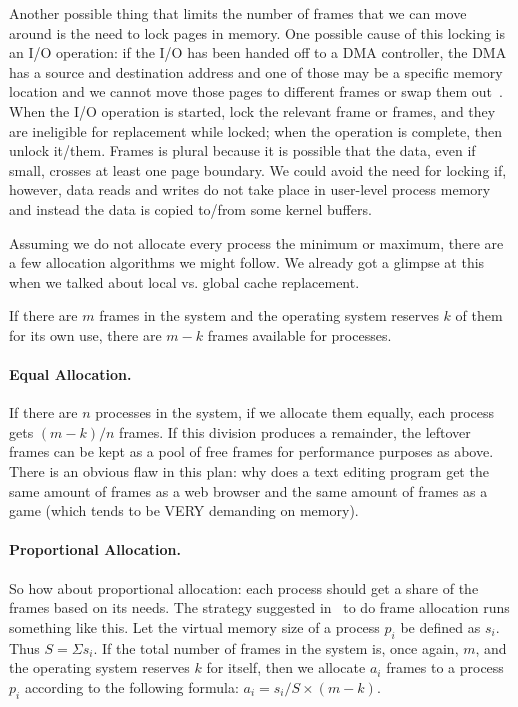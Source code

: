 Another possible thing that limits the number of frames that we can move around is the need to lock pages in memory. One possible cause of this locking is an I/O operation: if the I/O has been handed off to a DMA controller, the DMA has a source and destination address and one of those may be a specific memory location and we cannot move those pages to different frames or swap them out~\cite{osc}. When the I/O operation is started, lock the relevant frame or frames, and they are ineligible for replacement while locked; when the operation is complete, then unlock it/them. Frames is plural because it is possible that the data, even if small, crosses at least one page boundary. We could avoid the need for locking if, however, data reads and writes do not take place in user-level process memory and instead the data is copied to/from some kernel buffers.

Assuming we do not allocate every process the minimum or maximum, there are a few allocation algorithms we might follow. We already got a glimpse at this when we talked about local vs. global cache replacement.

If there are $m$ frames in the system and the operating system reserves $k$ of them for its own use, there are $m-k$ frames available for processes.

\paragraph{Equal Allocation.}  If there are $n$ processes in the system, if we allocate them equally, each process gets $(m-k)/n$ frames. If this division produces a remainder, the leftover frames can be kept as a pool of free frames for performance purposes as above. There is an obvious flaw in this plan: why does a text editing program get the same amount of frames as a web browser and the same amount of frames as a game (which tends to be VERY demanding on memory).

\paragraph{Proportional Allocation.} So how about proportional allocation: each process should get a share of the frames based on its needs. The strategy suggested in~\cite{osc} to do frame allocation runs something like this. Let the virtual memory size of a process $p_{i}$ be defined as $s_{i}$. Thus $S = \Sigma s_{i}$. If the total number of frames in the system is, once again, $m$, and the operating system reserves $k$ for itself, then we allocate $a_{i}$ frames to a process $p_{i}$ according to the following formula: $a_{i} = s_{i} / S \times (m - k)$.

